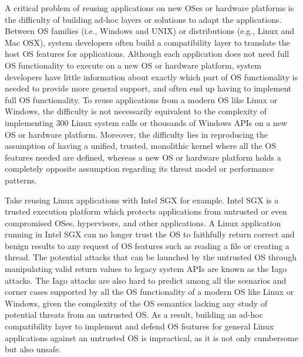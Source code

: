 A critical problem of reusing applications on new OSes or hardware platforms is the difficulty of building ad-hoc layers or solutions to adapt the applications.
Between OS families (i.e., Windows and UNIX) or distributions (e.g., Linux and Mac OSX),
system developers often build a compatibility layer to translate the host OS features for applications.
Although each application does not need full OS functionality to execute on a new OS or hardware platform, system developers have little information about exactly which part of OS functionality is needed to provide more general support, and often end up having to implement full OS functionality.
To reuse applications from a modern OS like Linux or Windows, the difficulty is not necessarily equivalent to the complexity of implementing 300 Linux system calls or thousands of Windows APIs on a new OS or hardware platform.
Moreover, the difficulty lies in reproducing the assumption of having a unified, trusted, monolithic kernel where all the OS features needed are defined,
whereas a new OS or hardware platform holds a completely opposite assumption
regarding its threat model or performance patterns.


Take reusing Linux applications with Intel SGX for example. Intel SGX is a trusted execution platform which protects applications from untrusted or even compromised OSes, hypervisors, and other applications.
A Linux application running in Intel SGX can no longer trust the OS to faithfully return correct and benign results
to any request of OS features such as reading a file or creating a thread.
The potential attacks that can be launched by the untrusted OS through manipulating valid return values to legacy system APIs are known as the Iago attacks.
The Iago attacks are also hard to predict among all the scenarios and corner cases
supported by all the OS functionality of a modern OS like Linux or Windows,
given the complexity of the OS semantics lacking any study of potential threats from an untrusted OS.
As a result,
building an ad-hoc compatibility layer to implement and defend OS features for general Linux applications
against an untrusted OS
is impractical, as it is not only cumbersome but also unsafe.



